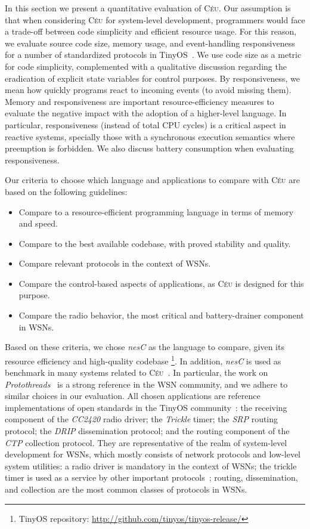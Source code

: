 \documentclass[letterpaper]{sig-alternate}
\newcommand{\CEU}{\textsc{C\'{e}u}\xspace}
\begin{document}
In this section we present a quantitative evaluation of \CEU.
%
Our assumption is that when considering \CEU for system-level development, 
programmers would face a trade-off between code simplicity and efficient 
resource usage.
%
For this reason, we evaluate source code size, memory usage, and event-handling 
responsiveness for a number of standardized protocols in 
TinyOS~\cite{wsn.teps}.
%
We use code size as a metric for code simplicity, complemented with a 
qualitative discussion regarding the eradication of explicit state variables 
for control purposes.
%
By responsiveness, we mean how quickly programs react to incoming events (to 
avoid missing them).
%
Memory and responsiveness are important resource-efficiency measures to 
evaluate the negative impact with the adoption of a higher-level language.
%
In particular, responsiveness (instead of total CPU cycles) is a critical 
aspect in reactive systems, specially those with a synchronous execution 
semantics where preemption is forbidden.
%
We also discuss battery consumption when evaluating responsiveness.

Our criteria to choose which language and applications to compare with \CEU are 
based on the following guidelines:
%
\begin{itemize}
\item Compare to a resource-efficient programming language in terms of memory 
and speed.
\item Compare to the best available codebase, with proved stability and 
quality.
\item Compare relevant protocols in the context of WSNs.
\item Compare the control-based aspects of applications, as \CEU is designed 
      for this purpose.
\item Compare the radio behavior, the most critical and battery-drainer 
      component in WSNs.
\end{itemize}
%
Based on these criteria, we chose \emph{nesC} as the language to compare, given 
its resource efficiency and high-quality codebase%
\footnote{TinyOS repository: \url{http://github.com/tinyos/tinyos-release/}}.
%
In addition, \emph{nesC} is used as benchmark in many systems related to 
\CEU~\cite{wsn.protothreads,wsn.sol,wsn.ocram,wsn.flowtalk}.
In particular, the work on \emph{Protothreads}~\cite{wsn.protothreads} is a 
strong reference in the WSN community, and we adhere to similar choices in our 
evaluation.
%
All chosen applications are reference implementations of open standards in the 
TinyOS community~\cite{wsn.teps}:
the receiving component of the \emph{CC2420} radio driver;
the \emph{Trickle} timer;
the \emph{SRP} routing protocol;
the \emph{DRIP} dissemination protocol;
and the routing component of the \emph{CTP} collection protocol.
%
They are representative of the realm of system-level development for WSNs, 
which mostly consists of network protocols and low-level system utilities:
%
a radio driver is mandatory in the context of WSNs;
the trickle timer is used as a service by other important
protocols~\cite{wsn.trickle,wsn.ctp};
routing, dissemination, and collection are the most common classes of protocols 
in WSNs.
\end{document}
